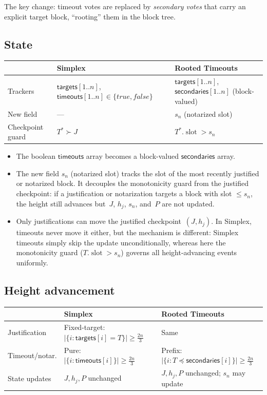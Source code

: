 \ifx\litemode\undefined\documentclass{article}\fi
\newcommand{\true}[0]{\ensuremath{\mathit{true}}}
\newcommand{\false}[0]{\ensuremath{\mathit{false}}}
\newcommand{\slot}[0]{\ensuremath{\operatorname{\mathrm{slot}}}}
\theoremstyle{plain}
\theoremstyle{definition}
\theoremstyle{remark}
\begin{document}
The key change: timeout votes are replaced by \emph{secondary votes} that carry an explicit target block, ``rooting'' them in the block tree.

\subsection*{State}

\begin{center}
\begin{tabularx}{\textwidth}{lXX}
\toprule
& \textbf{Simplex} & \textbf{Rooted Timeouts} \\
\midrule
Trackers & $\mathsf{targets}[1..n]$, $\mathsf{timeouts}[1..n] \in \{\true, \false\}$ & $\mathsf{targets}[1..n]$, $\mathsf{secondaries}[1..n]$ (block-valued) \\
New field & --- & $s_n$ (notarized slot) \\
Checkpoint guard & $T^* \succ J$ & $T^*.\slot > s_n$ \\
\bottomrule
\end{tabularx}
\end{center}

\begin{itemize}
  \item The boolean $\mathsf{timeouts}$ array becomes a block-valued $\mathsf{secondaries}$ array.
  \item The new field $s_n$ (notarized slot) tracks the slot of the most recently justified or notarized block.
        It decouples the monotonicity guard from the justified checkpoint: if a justification or notarization targets a block with slot $\leq s_n$, the height still advances but~$J$, $h_j$, $s_n$, and~$P$ are not updated.
  \item Only justifications can move the justified checkpoint~$(J, h_j)$.
        In Simplex, timeouts never move it either, but the mechanism is different: Simplex timeouts simply skip the update unconditionally, whereas here the monotonicity guard ($T.\slot > s_n$) governs all height-advancing events uniformly.
\end{itemize}

\subsection*{Height advancement}

\begin{center}
\begin{tabularx}{\textwidth}{lXX}
\toprule
& \textbf{Simplex} & \textbf{Rooted Timeouts} \\
\midrule
Justification & Fixed-target: $|\{i : \mathsf{targets}[i] = T\}| \geq \tfrac{2n}{3}$ & Same \\
Timeout/notar. & Pure: $|\{i : \mathsf{timeouts}[i]\}| \geq \tfrac{2n}{3}$ & Prefix: $|\{i : T \preceq \mathsf{secondaries}[i]\}| \geq \tfrac{2n}{3}$ \\
State updates & $J, h_j, P$ unchanged & $J, h_j, P$ unchanged; $s_n$ may update \\
\bottomrule
\end{tabularx}
\end{center}
\end{document}
